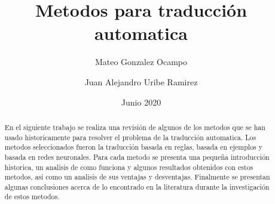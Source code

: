 \documentclass[12pt, letterpaper]{article}
\title{Metodos para traducción automatica}
\author{Mateo Gonzalez Ocampo \and Juan Alejandro Uribe Ramirez}
\date{Junio 2020}
\begin{document}
    \maketitle
    \begin{abstract}
        En el siguiente trabajo se realiza una revisión de algunos de los metodos que se han usado historicamente para resolver el problema de la 
        traducción automatica. Los metodos seleccionados fueron la traducción basada en reglas, basada en ejemplos y basada en redes neuronales.
        Para cada metodo se presenta una pequeña introducción historica, un analisis de como funciona y algunos resultados obtenidos con estos
         metodos, así como un analisis de sus ventajas y desventajas. Finalmente se presentan algunas conclusiones acerca de lo encontrado en
         la literatura durante la investigación de estos metodos. 
    \end{abstract}
\end{document}
